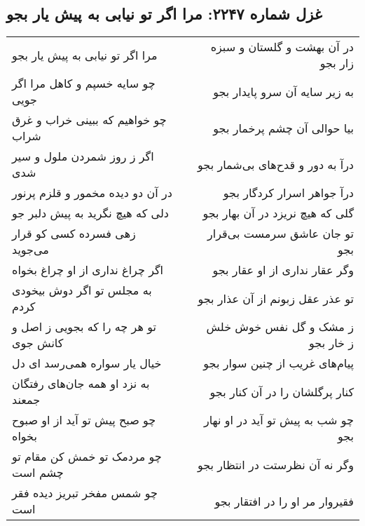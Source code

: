 \begin{center}
\section*{غزل شماره ۲۲۴۷: مرا اگر تو نیابی به پیش یار بجو}
\label{sec:2247}
\begin{longtable}{l p{0.5cm} r}
مرا اگر تو نیابی به پیش یار بجو
&&
در آن بهشت و گلستان و سبزه زار بجو
\\
چو سایه خسپم و کاهل مرا اگر جویی
&&
به زیر سایه آن سرو پایدار بجو
\\
چو خواهیم که ببینی خراب و غرق شراب
&&
بیا حوالی آن چشم پرخمار بجو
\\
اگر ز روز شمردن ملول و سیر شدی
&&
درآ به دور و قدح‌های بی‌شمار بجو
\\
در آن دو دیده مخمور و قلزم پرنور
&&
درآ جواهر اسرار کردگار بجو
\\
دلی که هیچ نگرید به پیش دلبر جو
&&
گلی که هیچ نریزد در آن بهار بجو
\\
زهی فسرده کسی کو قرار می‌جوید
&&
تو جان عاشق سرمست بی‌قرار بجو
\\
اگر چراغ نداری از او چراغ بخواه
&&
وگر عقار نداری از او عقار بجو
\\
به مجلس تو اگر دوش بیخودی کردم
&&
تو عذر عقل زبونم از آن عذار بجو
\\
تو هر چه را که بجویی ز اصل و کانش جوی
&&
ز مشک و گل نفس خوش خلش ز خار بجو
\\
خیال یار سواره همی‌رسد ای دل
&&
پیام‌های غریب از چنین سوار بجو
\\
به نزد او همه جان‌های رفتگان جمعند
&&
کنار پرگلشان را در آن کنار بجو
\\
چو صبح پیش تو آید از او صبوح بخواه
&&
چو شب به پیش تو آید در او نهار بجو
\\
چو مردمک تو خمش کن مقام تو چشم است
&&
وگر نه آن نظرستت در انتظار بجو
\\
چو شمس مفخر تبریز دیده فقر است
&&
فقیروار مر او را در افتقار بجو
\\
\end{longtable}
\end{center}
